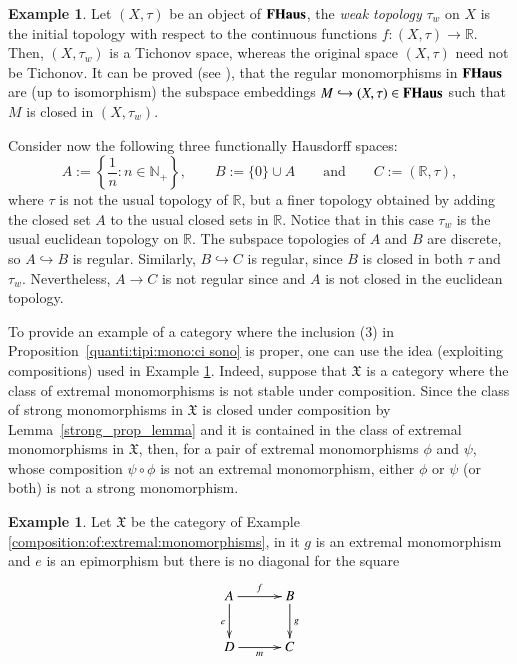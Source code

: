 \documentclass[12pt]{article}
\theoremstyle{definition}
\newtheorem{example}[lemma]{Example}
\def\N{\mathbb N}
\def\R{\mathbb R}
\def\X{\mathfrak X}
\newcommand{\FHaus}{\textbf{\textup{FHaus}}}
\numberwithin{equation}{section}
\begin{document}
\begin{example} \label{ex_FHAus}
Let $(X,\tau)$ be an object of $\FHaus$,  the {\em weak topology} $\tau_w$ on $X$ is the initial topology with respect to the continuous functions $f\colon (X,\tau) \to \R$. Then, $(X,\tau_w)$ is a Tichonov space, whereas the original space $(X,\tau)$ need not be Tichonov. It can be proved (see \cite[Exercise 6.B]{DT}), that the 
regular monomorphisms in $\FHaus$ are (up to isomorphism) the subspace embeddings $M \hookrightarrow (X,\tau) \in \FHaus$ such that $M$ is closed in $(X, \tau_w)$.

Consider now the following three functionally Hausdorff spaces: 
\[
A:=\left\{\frac{1}{n}: n\in \N_+\right\},\qquad B:=\{0\} \cup A\qquad \text{and}\qquad C:=(\R,\tau),
\] 
where $\tau$ is not the usual topology of $\R$, but a finer topology obtained by adding the closed set $A$ to the usual closed sets in $\R$. Notice that in this case $\tau_w$ is the usual euclidean topology on $\R$. The subspace topologies of $A$ and $B$ are discrete, so $A \hookrightarrow B$ is regular. Similarly, $B \hookrightarrow C$ is regular, since $B$ is closed in both $\tau$ and $\tau_w$. Nevertheless, $A \to C$ is not regular since and $A$ is not closed in the euclidean topology.
\end{example}


To provide an example of a category where the inclusion (3) in Proposition~\ref{quanti:tipi:mono:ci sono} is proper, one can use the idea (exploiting compositions) used in Example \ref{ex_FHAus}. Indeed,
suppose that $\X$ is a category where the class of extremal monomorphisms is not stable under composition. Since  the class of strong monomorphisms in $\X$ is closed under composition by Lemma~\ref{strong_prop_lemma} and it is contained in the class of  extremal monomorphisms in $\X$, then, for a pair of extremal monomorphisms $\phi$ and $\psi$,  whose composition $\psi\circ\phi$ is not an extremal monomorphism, either $\phi$ or $\psi$ (or both) is not a strong monomorphism.
\begin{example} Let $\X$ be the category of Example  \ref{composition:of:extremal:monomorphisms}, in it $g$ is an extremal monomorphism and $e$ is an epimorphism but there is no diagonal for the square
	\[
	\xymatrix@C=30pt{
		A\ar@{>}[d]_{e}\ar@{>}[r]^f&B\ar@{>}[d]^{g}\\
		D\ar@{>}[r]_m&C}\]	
\end{example} 
\end{document}
